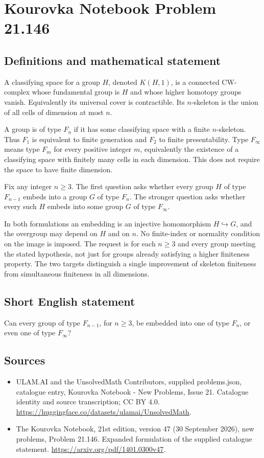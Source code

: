 \documentclass[11pt,a4paper]{article}
\begin{document}
\section*{Kourovka Notebook Problem 21.146}\label{statement}

\subsection{Definitions and mathematical statement}
A classifying space for a group $H$, denoted $K(H,1)$, is a connected CW-complex whose fundamental group is $H$ and whose higher homotopy groups vanish. Equivalently its universal cover is contractible. Its $n$-skeleton is the union of all cells of dimension at most $n$.

A group is of type $F_n$ if it has some classifying space with a finite $n$-skeleton. Thus $F_1$ is equivalent to finite generation and $F_2$ to finite presentability. Type $F_\infty$ means type $F_m$ for every positive integer $m$, equivalently the existence of a classifying space with finitely many cells in each dimension. This does not require the space to have finite dimension.

Fix any integer $n\ge3$. The first question asks whether every group $H$ of type $F_{n-1}$ embeds into a group $G$ of type $F_n$. The stronger question asks whether every such $H$ embeds into some group $G$ of type $F_\infty$.

In both formulations an embedding is an injective homomorphism $H\hookrightarrow G$, and the overgroup may depend on $H$ and on $n$. No finite-index or normality condition on the image is imposed. The request is for each $n\ge3$ and every group meeting the stated hypothesis, not just for groups already satisfying a higher finiteness property. The two targets distinguish a single improvement of skeleton finiteness from simultaneous finiteness in all dimensions.
\subsection{Short English statement}
Can every group of type $F_{n-1}$, for $n\ge3$, be embedded into one of type $F_n$, or even one of type $F_\infty$?
\subsection{Sources}
\begin{itemize}
\item[S1] ULAM.AI and the UnsolvedMath Contributors, supplied problems.json, catalogue entry, Kourovka Notebook - New Problems, Issue 21. Catalogue identity and source transcription; CC BY 4.0.
\url{https://huggingface.co/datasets/ulamai/UnsolvedMath}.
\item[S2] The Kourovka Notebook, 21st edition, version 47 (30 September 2026), new problems, Problem 21.146. Expanded formulation of the supplied catalogue statement.
\url{https://arxiv.org/pdf/1401.0300v47}.
\end{itemize}
\end{document}
